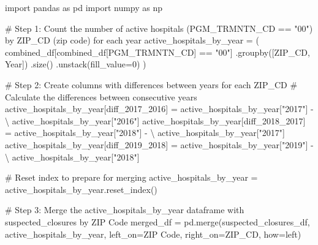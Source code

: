 \documentclass[
  letterpaper,
  DIV=11,
  numbers=noendperiod]{scrartcl}
\newenvironment{Shaded}{\begin{snugshade}}{\end{snugshade}}
\newcommand{\CommentTok}[1]{\textcolor[rgb]{0.37,0.37,0.37}{#1}}
\newcommand{\DecValTok}[1]{\textcolor[rgb]{0.68,0.00,0.00}{#1}}
\newcommand{\ImportTok}[1]{\textcolor[rgb]{0.00,0.46,0.62}{#1}}
\newcommand{\NormalTok}[1]{\textcolor[rgb]{0.00,0.23,0.31}{#1}}
\newcommand{\OperatorTok}[1]{\textcolor[rgb]{0.37,0.37,0.37}{#1}}
\newcommand{\StringTok}[1]{\textcolor[rgb]{0.13,0.47,0.30}{#1}}
\begin{document}
\begin{Shaded}
\begin{Highlighting}[]
\ImportTok{import}\NormalTok{ pandas }\ImportTok{as}\NormalTok{ pd}
\ImportTok{import}\NormalTok{ numpy }\ImportTok{as}\NormalTok{ np}

\CommentTok{\# Step 1: Count the number of active hospitals (PGM\_TRMNTN\_CD == "00") by ZIP\_CD (zip code) for each year}
\NormalTok{active\_hospitals\_by\_year }\OperatorTok{=}\NormalTok{ (}
\NormalTok{    combined\_df[combined\_df[}\StringTok{\textquotesingle{}PGM\_TRMNTN\_CD\textquotesingle{}}\NormalTok{] }\OperatorTok{==} \StringTok{"00"}\NormalTok{]}
\NormalTok{    .groupby([}\StringTok{\textquotesingle{}ZIP\_CD\textquotesingle{}}\NormalTok{, }\StringTok{\textquotesingle{}Year\textquotesingle{}}\NormalTok{])}
\NormalTok{    .size()}
\NormalTok{    .unstack(fill\_value}\OperatorTok{=}\DecValTok{0}\NormalTok{)}
\NormalTok{)}

\CommentTok{\# Step 2: Create columns with differences between years for each ZIP\_CD}
\CommentTok{\# Calculate the differences between consecutive years}
\NormalTok{active\_hospitals\_by\_year[}\StringTok{\textquotesingle{}diff\_2017\_2016\textquotesingle{}}\NormalTok{] }\OperatorTok{=}\NormalTok{ active\_hospitals\_by\_year[}\StringTok{"2017"}\NormalTok{] }\OperatorTok{{-}} \OperatorTok{\textbackslash{}}
\NormalTok{    active\_hospitals\_by\_year[}\StringTok{"2016"}\NormalTok{]}
\NormalTok{active\_hospitals\_by\_year[}\StringTok{\textquotesingle{}diff\_2018\_2017\textquotesingle{}}\NormalTok{] }\OperatorTok{=}\NormalTok{ active\_hospitals\_by\_year[}\StringTok{"2018"}\NormalTok{] }\OperatorTok{{-}} \OperatorTok{\textbackslash{}}
\NormalTok{    active\_hospitals\_by\_year[}\StringTok{"2017"}\NormalTok{]}
\NormalTok{active\_hospitals\_by\_year[}\StringTok{\textquotesingle{}diff\_2019\_2018\textquotesingle{}}\NormalTok{] }\OperatorTok{=}\NormalTok{ active\_hospitals\_by\_year[}\StringTok{"2019"}\NormalTok{] }\OperatorTok{{-}} \OperatorTok{\textbackslash{}}
\NormalTok{    active\_hospitals\_by\_year[}\StringTok{"2018"}\NormalTok{]}

\CommentTok{\# Reset index to prepare for merging}
\NormalTok{active\_hospitals\_by\_year }\OperatorTok{=}\NormalTok{ active\_hospitals\_by\_year.reset\_index()}

\CommentTok{\# Step 3: Merge the active\_hospitals\_by\_year dataframe with suspected\_closures by ZIP Code}
\NormalTok{merged\_df }\OperatorTok{=}\NormalTok{ pd.merge(suspected\_closures\_df, active\_hospitals\_by\_year,}
\NormalTok{                     left\_on}\OperatorTok{=}\StringTok{\textquotesingle{}ZIP Code\textquotesingle{}}\NormalTok{, right\_on}\OperatorTok{=}\StringTok{\textquotesingle{}ZIP\_CD\textquotesingle{}}\NormalTok{, how}\OperatorTok{=}\StringTok{\textquotesingle{}left\textquotesingle{}}\NormalTok{)}


\end{Highlighting}
\end{Shaded}
\end{document}
